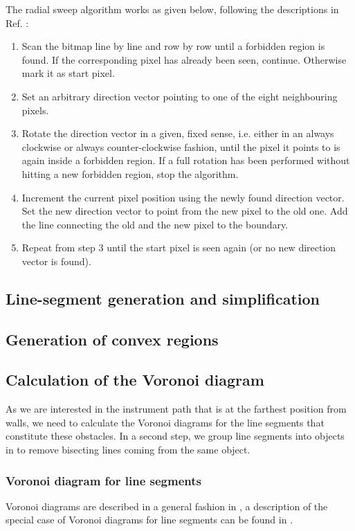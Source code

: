 The radial sweep algorithm works as given below, following the descriptions in Ref. \cite{web_radial_sweep}:
\begin{enumerate}
	\item Scan the bitmap line by line and row by row until a forbidden region is found. 
		If the corresponding pixel has already been seen, continue. Otherwise mark it as start pixel.
	\item Set an arbitrary direction vector pointing to one of the eight neighbouring pixels.
	\item Rotate the direction vector in a given, fixed sense, i.e. either in an always clockwise or 
		always counter-clockwise fashion, until the pixel it points to is again inside a forbidden region.
		If a full rotation has been performed without hitting a new forbidden region, stop the algorithm.
	\item Increment the current pixel position using the newly found direction vector. 
		Set the new direction vector to point from the new pixel to the old one.
		Add the line connecting the old and the new pixel to the boundary.
	\item Repeat from step 3 until the start pixel is seen again (or no new direction vector is found).
\end{enumerate}



\subsection{Line-segment generation and simplification}



\subsection{Generation of convex regions}



\subsection{Calculation of the Voronoi diagram}
As we are interested in the instrument path that is at the farthest position from walls, we need to calculate
the Voronoi diagrams for the line segments that constitute these obstacles. In a second step, we group line
segments into objects in to remove bisecting lines coming from the same object.

\subsubsection*{Voronoi diagram for line segments}
Voronoi diagrams are described in a general fashion in \cite[Ch. 7, pp. 147f]{Berg2008}, a description of the special
case of Voronoi diagrams for line segments can be found in \cite[Ch. 7.3, pp. 160-163]{Berg2008}.

